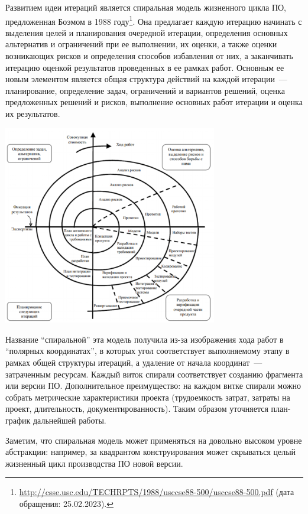 \documentclass{../../text-style}
\begin{document}
Развитием идеи итераций является спиральная модель жизненного цикла ПО, предложенная Боэмом в 1988 году\footnote{\url{http://csse.usc.edu/TECHRPTS/1988/usccse88-500/usccse88-500.pdf} (дата обращения: 25.02.2023).}.
Она предлагает каждую итерацию начинать с выделения целей и планирования очередной итерации, определения основных альтернатив и ограничений при ее выполнении, их оценки, а также оценки возникающих рисков и определения способов избавления от них, а заканчивать итерацию оценкой результатов проведенных в ее рамках работ.
Основным ее новым элементом является общая структура действий на каждой итерации~--- планирование, определение задач, ограничений и вариантов решений, оценка предложенных решений и рисков, выполнение основных работ итерации и оценка их результатов.

\begin{center}
    \includegraphics[width=0.7\textwidth]{spiralModel.png}
\end{center}

Название \enquote{спиральной} эта модель получила из-за изображения хода работ в \enquote{полярных координатах}, в которых угол соответствует выполняемому этапу в рамках общей структуры итераций, а удаление от начала координат~--- затраченным ресурсам.
Каждый виток спирали соответствует созданию фрагмента или версии ПО.
Дополнительное преимущество: на каждом витке спирали можно собрать метрические характеристики проекта (трудоемкость затрат, затраты на проект, длительность, документированность).
Таким образом уточняется план-график дальнейшей работы.

Заметим, что спиральная модель может применяться на довольно высоком уровне абстракции: например, за квадрантом конструирования может скрываться целый жизненный цикл производства ПО новой версии.
\end{document}
